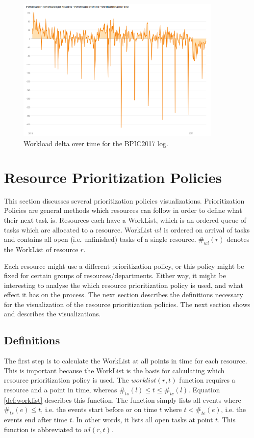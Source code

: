 \begin{figure}[h]
	\centering
    \includegraphics[width=0.9\textwidth]{figures/workload_delta.png}
    \caption{Workload delta over time for the BPIC2017 log.}
    \label{fig:workload_delta}
\end{figure}

\section{Resource Prioritization Policies}
This section discusses several prioritization policies visualizations. Prioritization Policies are general methods which resources can follow in order to define what their next task is. Resources each have a WorkList, which is an ordered queue of tasks which are allocated to a resource. WorkList $wl$ is ordered on arrival of tasks and contains all open (i.e. unfinished) tasks of a single resource. $\#_{wl}(r)$ denotes the WorkList of resource $r$. 

Each resource might use a different prioritization policy, or this policy might be fixed for certain groups of resources/departments. Either way, it might be interesting to analyse the which resource prioritization policy is used, and what effect it has on the process. The next section describes the definitions necessary for the visualization of the resource prioritization policies. The next section shows and describes the visualizations. 

\subsection{Definitions}

The first step is to calculate the WorkList at all points in time for each resource. This is important because the WorkList is the basis for calculating which resource prioritization policy is used. The $worklist(r, t)$ function requires a resource and a point in time, whereas $\#_{ts}(l) \leq t \leq \#_{te}(l)$. Equation \ref{def:worklist} describes this function. The function simply lists all events where $\#_{ts}(e) \leq t$, i.e. the events start before or on time $t$ where $t < \#_{te}(e)$, i.e. the events end after time $t$. In other words, it lists all open tasks at point $t$. This function is abbreviated to $wl(r,t)$.

